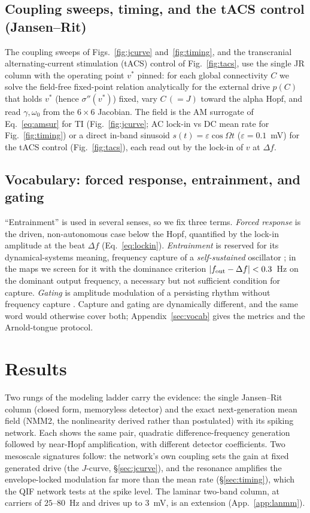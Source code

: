 \documentclass[11pt,a4paper]{article}
\newcommand{\Sig}{\sigma}
\begin{document}
\subsection{Coupling sweeps, timing, and the tACS control (Jansen--Rit)}
The coupling sweeps of Figs.~\ref{fig:jcurve} and~\ref{fig:timing}, and the transcranial
alternating-current stimulation (tACS) control of Fig.~\ref{fig:tacs}, use the single JR
column with the operating point $v^*$ pinned: for
each global connectivity $C$ we solve the field-free fixed-point relation analytically
for the external drive $p(C)$ that holds $v^*$ (hence $\Sig''(v^*)$) fixed, vary $C\,(=J)$
toward the alpha Hopf, and read $\gamma,\omega_0$ from the $6\times6$ Jacobian. The field
is the AM surrogate of Eq.~\eqref{eq:amsur} for TI (Fig.~\ref{fig:jcurve}; AC lock-in vs DC mean
rate for Fig.~\ref{fig:timing}) or a direct in-band sinusoid $s(t)=\varepsilon\cos\Omega t$
($\varepsilon=0.1$~mV) for the tACS control (Fig.~\ref{fig:tacs}), each read out by the
lock-in of $v$ at $\Delta f$.

\subsection{Vocabulary: forced response, entrainment, and gating}
``Entrainment'' is used in several senses, so we fix three terms. \emph{Forced response}
is the driven, non-autonomous case below the Hopf, quantified by the lock-in amplitude at
the beat $\Delta f$ (Eq.~\eqref{eq:lockin}). \emph{Entrainment} is reserved for its
dynamical-systems meaning, frequency capture of a \emph{self-sustained} oscillator
\cite{pikovsky2001}; in the maps we screen for it with the dominance criterion
$|f_{\rm out}-\Delta f|<0.3$~Hz on the dominant output frequency, a necessary but not
sufficient condition for capture. \emph{Gating} is amplitude modulation of a persisting rhythm without
frequency capture \cite{canolty2010,tort2010}. Capture and gating are dynamically different, and the same word would otherwise cover
both; Appendix~\ref{sec:vocab} gives the metrics and the Arnold-tongue protocol.

\section{Results}
Two rungs of the modeling ladder carry the evidence: the single Jansen--Rit column
(closed form, memoryless detector) and the exact next-generation mean field (NMM2, the
nonlinearity derived rather than postulated) with its spiking network. Each shows the same
pair, quadratic difference-frequency generation followed by near-Hopf amplification, with
different detector coefficients. Two mesoscale signatures follow: the network's own
coupling sets the gain at fixed generated drive (the $J$-curve, \S\ref{sec:jcurve}), and
the resonance amplifies the envelope-locked modulation far more than the mean rate
(\S\ref{sec:timing}), which the QIF network tests at the spike level. The laminar two-band
column, at carriers of $25$--$80$~Hz and drives up to $3$~mV, is an extension
(App.~\ref{app:lanmm}).
\end{document}
